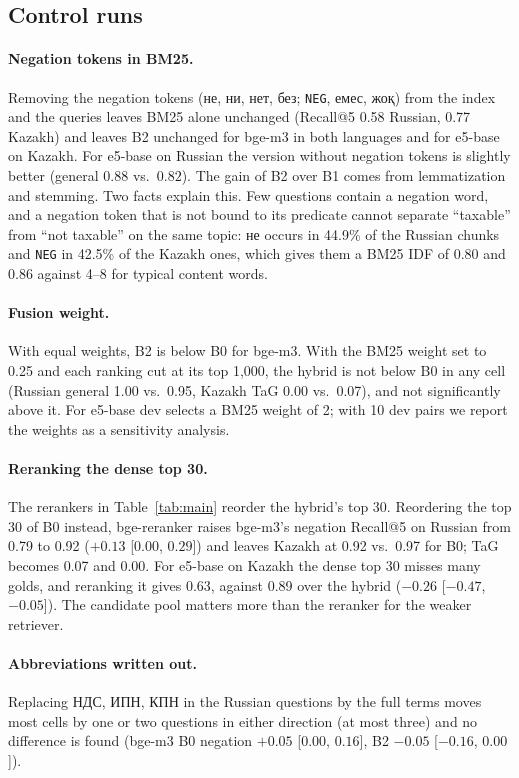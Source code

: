 \documentclass[11pt]{article}
\newcommand{\ru}[1]{#1}
\begin{document}
\subsection{Control runs}
\paragraph{Negation tokens in BM25.} Removing the negation tokens (\ru{не, ни, нет, без}; \texttt{NEG},
\ru{емес}, \ru{жоқ}) from the index and the queries leaves BM25 alone unchanged (Recall@5 0.58 Russian, 0.77
Kazakh) and leaves B2 unchanged for bge-m3 in both languages and for e5-base on Kazakh. For e5-base on Russian
the version without negation tokens is slightly better (general $0.88$ vs.\ $0.82$). The gain of B2 over B1
comes from lemmatization and stemming. Two facts explain this. Few questions contain a negation word, and a
negation token that is not bound to its predicate cannot separate ``taxable'' from ``not taxable'' on the
same topic: \ru{не} occurs in 44.9\% of the Russian chunks and \texttt{NEG} in 42.5\% of the Kazakh ones, which
gives them a BM25 IDF of 0.80 and 0.86 against 4--8 for typical content words.

\paragraph{Fusion weight.} With equal weights, B2 is below B0 for bge-m3. With the BM25 weight set to 0.25 and
each ranking cut at its top 1,000, the hybrid is not below B0 in any cell (Russian general 1.00 vs.\ 0.95,
Kazakh TaG 0.00 vs.\ 0.07), and not significantly above it. For e5-base dev selects a BM25 weight of 2; with 10
dev pairs we report the weights as a sensitivity analysis.

\paragraph{Reranking the dense top 30.} The rerankers in Table~\ref{tab:main} reorder the hybrid's top 30.
Reordering the top 30 of B0 instead, bge-reranker raises bge-m3's negation Recall@5 on Russian from 0.79 to
0.92 ($+0.13$ [$0.00$, $0.29$]) and leaves Kazakh at 0.92 vs.\ 0.97 for B0; TaG becomes 0.07 and 0.00. For
e5-base on Kazakh the dense top 30 misses many golds, and reranking it gives 0.63, against 0.89 over the hybrid
($-0.26$ [$-0.47$, $-0.05$]). The candidate pool matters more than the reranker for the weaker retriever.

\paragraph{Abbreviations written out.} Replacing \ru{НДС, ИПН, КПН} in the Russian questions by the full
terms moves most cells by one or two questions in either direction (at most three) and no difference is found (bge-m3 B0 negation
$+0.05$ [$0.00$, $0.16$], B2 $-0.05$ [$-0.16$, $0.00$]).
\end{document}
